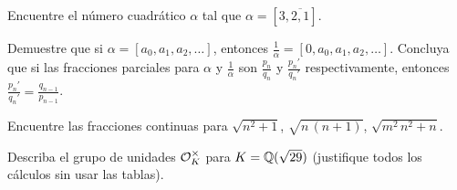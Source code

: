 \begin{ejercicio}
  Encuentre el número cuadrático $\alpha$ tal que
  $\alpha = [3, \overline{2,1}]$.
\end{ejercicio}

\begin{ejercicio}
  Demuestre que si $\alpha = [a_0,a_1,a_2,\ldots]$, entonces
  $\frac{1}{\alpha} = [0,a_0,a_1,a_2,\ldots]$. Concluya que si las fracciones
  parciales para $\alpha$ y $\frac{1}{\alpha}$ son $\frac{p_n}{q_n}$ y
  $\frac{p_n'}{q_n'}$ respectivamente, entonces
  $\frac{p_n'}{q_n'} = \frac{q_{n-1}}{p_{n-1}}$.
\end{ejercicio}

\begin{ejercicio}
  Encuentre las fracciones continuas para $\sqrt{n^2+1}$, $\sqrt{n\,(n+1)}$,
  $\sqrt{m^2\,n^2 + n}$.
\end{ejercicio}

\begin{ejercicio}
  Describa el grupo de unidades $\mathcal{O}_K^\times$ para $K = \mathbb{Q} (\sqrt{29})$
  (justifique todos los cálculos sin usar las tablas).
\end{ejercicio}
